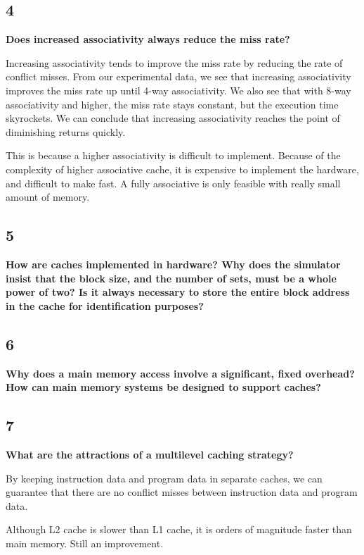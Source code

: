 \documentclass[letterpaper, 12pt, oneside]{memoir}
\begin{document}
\subsection{4}
\textbf{Does increased associativity always reduce the miss rate?}

Increasing associativity tends to improve the miss rate by reducing the rate of
conflict misses. From our experimental data, we see that increasing
associativity improves the miss rate up until 4-way associativity. We also see
that with 8-way associativity and higher, the miss rate stays constant, but the
execution time skyrockets. We can conclude that increasing associativity reaches
the point of diminishing returns quickly.

This is because a higher associativity is difficult to implement. Because of
the complexity of higher associative cache, it is expensive to implement the
hardware, and difficult to make fast. A fully associative is only feasible with
really small amount of memory.

\subsection{5}
\textbf{How are caches implemented in hardware? Why does the simulator insist
that the block size, and the number of sets, must be a whole power of two? Is it always
necessary to store the entire block address in the cache for identification
purposes?}


\subsection{6}
\textbf{Why does a main memory access involve a significant, fixed overhead? How
can main memory systems be designed to support caches?}


\subsection{7}
\textbf{What are the attractions of a multilevel caching strategy?}

By keeping instruction data and program data in separate caches, we can
guarantee that there are no conflict misses between instruction data and
program data.

Although L2 cache is slower than L1 cache, it is orders of
magnitude faster than main memory. Still an improvement.
\end{document}
